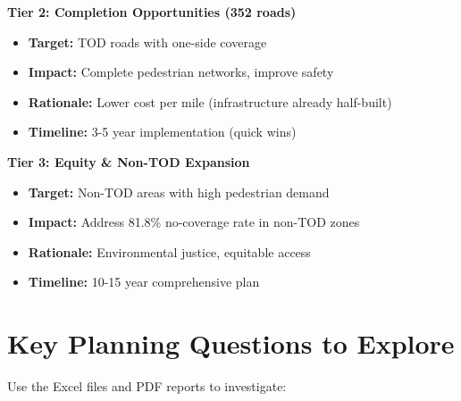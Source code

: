 \documentclass[11pt,letterpaper]{article}
\begin{document}
\textbf{Tier 2: Completion Opportunities (352 roads)}
\begin{itemize}[leftmargin=*]
    \item \textbf{Target:} TOD roads with one-side coverage
    \item \textbf{Impact:} Complete pedestrian networks, improve safety
    \item \textbf{Rationale:} Lower cost per mile (infrastructure already half-built)
    \item \textbf{Timeline:} 3-5 year implementation (quick wins)
\end{itemize}

\textbf{Tier 3: Equity \& Non-TOD Expansion}
\begin{itemize}[leftmargin=*]
    \item \textbf{Target:} Non-TOD areas with high pedestrian demand
    \item \textbf{Impact:} Address 81.8\% no-coverage rate in non-TOD zones
    \item \textbf{Rationale:} Environmental justice, equitable access
    \item \textbf{Timeline:} 10-15 year comprehensive plan
\end{itemize}

\vspace{1em}

\section{Key Planning Questions to Explore}

Use the Excel files and PDF reports to investigate:
\end{document}
